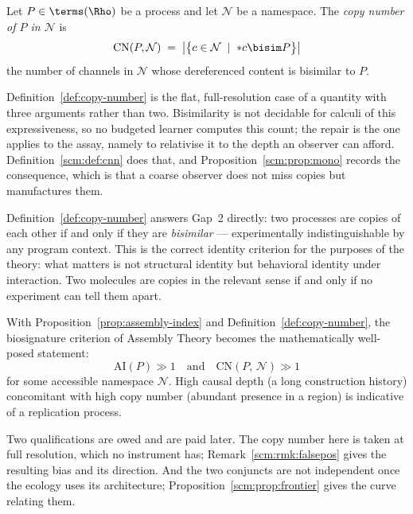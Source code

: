 \begin{definition}
\label{def:copy-number}
Let $P \in \terms(\Rho)$ be a process and let $\mathcal{N}$ be a
namespace.
The \emph{copy number of $P$ in $\mathcal{N}$} is
\[
  \mathrm{CN}(P, \mathcal{N}) \;=\;
  \bigl|\bigl\{ c \in \mathcal{N} \;\mid\; {*}c \bisim P \bigr\}\bigr|
\]
the number of channels in $\mathcal{N}$ whose dereferenced content
is bisimilar to $P$.
\end{definition}

\begin{remark}
\label{rmk:cn-not-effective}
Definition~\ref{def:copy-number} is the flat, full-resolution case of
a quantity with three arguments rather than two.
Bisimilarity is not decidable for calculi of this expressiveness, so
no budgeted learner computes this count; the repair is the one
\chSci applies to the assay, namely to relativise it to the depth an
observer can afford.
Definition~\ref{scm:def:cnn} does that, and
Proposition~\ref{scm:prop:mono} records the consequence, which is
that a coarse observer does not miss copies but manufactures them.
\end{remark}

\begin{remark}
Definition~\ref{def:copy-number} answers Gap~2 directly: two
processes are copies of each other if and only if they are
\emph{bisimilar} --- experimentally indistinguishable by any
program context.
This is the correct identity criterion for the purposes of the
theory: what matters is not structural identity but behavioral
identity under interaction.
Two molecules are copies in the relevant sense if and only if no
experiment can tell them apart.
\end{remark}

\begin{remark}
With Proposition~\ref{prop:assembly-index} and
Definition~\ref{def:copy-number}, the biosignature criterion of
Assembly Theory becomes the mathematically well-posed statement:
\[
  \mathrm{AI}(P) \gg 1 \quad \text{and} \quad
  \mathrm{CN}(P,\,\mathcal{N}) \gg 1
\]
for some accessible namespace $\mathcal{N}$.
High causal depth (a long construction history) concomitant with
high copy number (abundant presence in a region) is indicative
of a replication process.

Two qualifications are owed and are paid later.
The copy number here is taken at full resolution, which no instrument
has; Remark~\ref{scm:rmk:falsepos} gives the resulting bias and its
direction.
And the two conjuncts are not independent once the ecology uses its
architecture; Proposition~\ref{scm:prop:frontier} gives the curve
relating them.
\end{remark}

